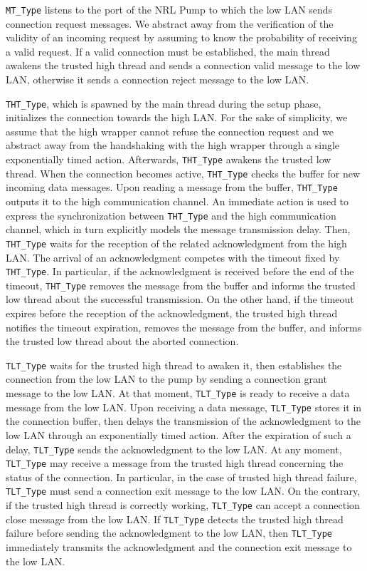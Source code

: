 {\tt MT\_Type} listens to the port of the NRL Pump to which the low LAN sends connection request messages.
We abstract away from the verification of the validity of an incoming request by assuming to know the
probability of receiving a valid request. If a valid connection must be established, the main thread awakens
the trusted high thread and sends a connection valid message to the low LAN, otherwise it sends a connection
reject message to the low LAN.

{\tt THT\_Type}, which is spawned by the main thread during the setup phase, initializes the connection
towards the high LAN. For the sake of simplicity, we assume that the high wrapper cannot refuse the
connection request and we abstract away from the handshaking with the high wrapper through a single
exponentially timed action. Afterwards, {\tt THT\_Type} awakens the trusted low thread. When the connection
becomes active, {\tt THT\_Type} checks the buffer for new incoming data messages. Upon reading a message
from the buffer, {\tt THT\_Type} outputs it to the high communication channel. An immediate action is used
to express the synchronization between {\tt THT\_Type} and the high communication channel, which in turn
explicitly models the message transmission delay. Then, {\tt THT\_Type} waits for the reception of the
related acknowledgment from the high LAN. The arrival of an acknowledgment competes with the timeout fixed
by {\tt THT\_Type}. In particular, if the acknowledgment is received before the end of the timeout,
{\tt THT\_Type} removes the message from the buffer and informs the trusted low thread about the successful
transmission. On the other hand, if the timeout expires before the reception of the acknowledgment, the
trusted high thread notifies the timeout expiration, removes the message from the buffer, and informs the
trusted low thread about the aborted connection.

{\tt TLT\_Type} waits for the trusted high thread to awaken it, then establishes the connection from the low
LAN to the pump by sending a connection grant message to the low LAN. At that moment, {\tt TLT\_Type} is
ready to receive a data message from the low LAN. Upon receiving a data message, {\tt TLT\_Type} stores it
in the connection buffer, then delays the transmission of the acknowledgment to the low LAN through an
exponentially timed action. After the expiration of such a delay, {\tt TLT\_Type} sends the acknowledgment
to the low LAN. At any moment, {\tt TLT\_Type} may receive a message from the trusted high thread concerning
the status of the connection. In particular, in the case of trusted high thread failure, {\tt TLT\_Type}
must send a connection exit message to the low LAN. On the contrary, if the trusted high thread is correctly
working, {\tt TLT\_Type} can accept a connection close message from the low LAN. If {\tt TLT\_Type} detects
the trusted high thread failure before sending the acknowledgment to the low LAN, then {\tt TLT\_Type}
immediately transmits the acknowledgment and the connection exit message to the low LAN.

